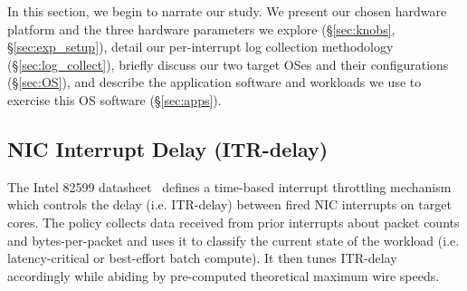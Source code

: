 
In this section, we begin to narrate our study.
We present our chosen hardware platform and the three hardware parameters we explore (\S\ref{sec:knobs}, \S\ref{sec:exp_setup}),
detail our per-interrupt log collection methodology (\S\ref{sec:log_collect}),
briefly discuss our two target OSes and their configurations (\S\ref{sec:OS}),
and describe the application software and workloads we use to exercise this OS software (\S\ref{sec:apps}).



\subsection{NIC Interrupt Delay (ITR-delay)}
\label{sec:knobs_itr}
The Intel 82599 datasheet~\cite{82599}
defines a time-based interrupt throttling mechanism
which controls the delay (i.e. ITR-delay)
between fired NIC interrupts on target cores.
The policy collects data received from prior interrupts
about packet counts and bytes-per-packet
and uses it to classify the current state of the workload
(i.e. latency-critical or best-effort batch compute).
It then tunes ITR-delay accordingly
while abiding by pre-computed theoretical maximum wire speeds.


